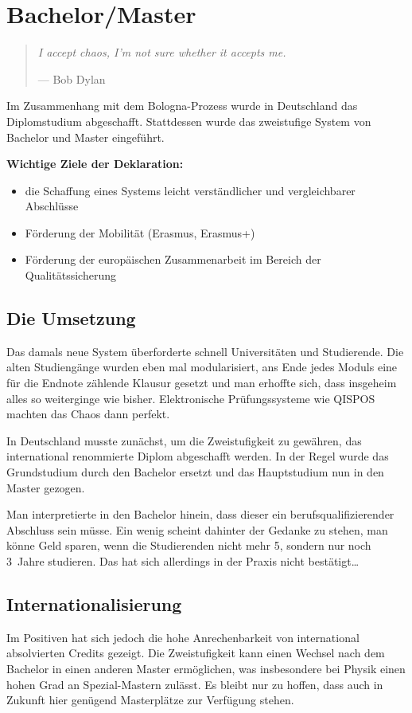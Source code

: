 \section{Bachelor/Master}

\begin{multicols}{2}
\begin{quote}
	\textit{\foreignlanguage{english}{I accept chaos, I'm not sure whether it accepts me.}}
	
	\hfill--- Bob Dylan
\end{quote}
Im Zusammenhang mit dem Bologna-Prozess wurde in Deutschland das Diplomstudium abgeschafft.
Stattdessen wurde das zweistufige System von Bachelor und Master eingeführt.

\textbf{Wichtige Ziele der Deklaration:}
\begin{itemize}
	\item die Schaffung eines Systems leicht verständlicher und vergleichbarer Abschlüsse
	\item Förderung der Mobilität (Erasmus, Erasmus+)
	\item Förderung der europäischen Zusammenarbeit im Bereich der Qualitätssicherung
\end{itemize}

\subsection{Die Umsetzung}
Das damals neue System überforderte schnell Universitäten und Studierende.
Die alten Studiengänge wurden eben mal modularisiert, ans Ende jedes Moduls eine für die Endnote zählende Klausur gesetzt und man erhoffte sich, dass insgeheim alles so weiterginge wie bisher.
Elektronische Prüfungssysteme wie QISPOS machten das Chaos dann perfekt.

In Deutschland musste zunächst, um die Zweistufigkeit zu gewähren, das international renommierte Diplom abgeschafft werden.
In der Regel wurde das Grundstudium durch den Bachelor ersetzt und das Hauptstudium nun in den Master gezogen.

Man interpretierte in den Bachelor hinein, dass dieser ein berufsqualifizierender Abschluss sein müsse.
Ein wenig scheint dahinter der Gedanke zu stehen, man könne Geld sparen, wenn die Studierenden nicht mehr 5, sondern nur noch 3~Jahre studieren.
Das hat sich allerdings in der Praxis nicht bestätigt\dots

\subsection{Internationalisierung}
Im Positiven hat sich jedoch die hohe Anrechenbarkeit von international absolvierten Credits gezeigt.
Die Zweistufigkeit kann einen Wechsel nach dem Bachelor in einen anderen Master ermöglichen, was insbesondere bei Physik einen hohen Grad an Spezial-Mastern zulässt.
Es bleibt nur zu hoffen, dass auch in Zukunft hier genügend Masterplätze zur Verfügung stehen.


\end{multicols}
